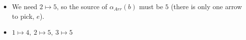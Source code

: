\begin{itemize}
    \item  We need $2 \mapsto 5$, so the source of $\alpha_{Arr}(b)$ must be $5$ (there is only one arrow to pick, $e$).
    \item $1 \mapsto 4,\ 2\mapsto 5,\ 3 \mapsto 5$
  \end{itemize}
